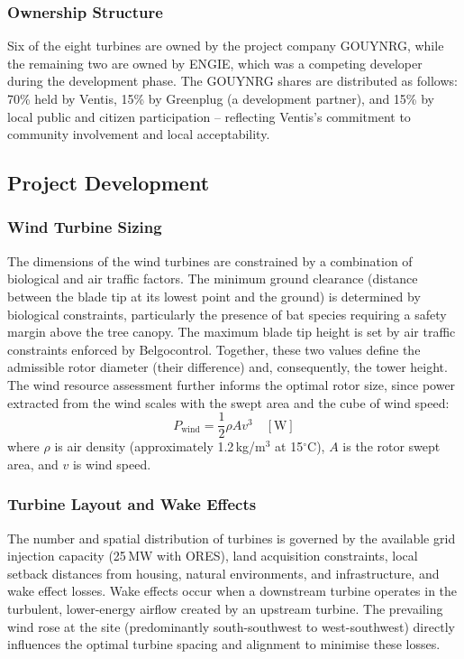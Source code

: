 \subsubsection{Ownership Structure}

Six of the eight turbines are owned by the project company GOUYNRG, while the remaining two
are owned by ENGIE, which was a competing developer during the development phase. The GOUYNRG
shares are distributed as follows: 70\% held by Ventis, 15\% by Greenplug (a development
partner), and 15\% by local public and citizen participation -- reflecting Ventis's commitment
to community involvement and local acceptability.

\subsection{Project Development}

\subsubsection{Wind Turbine Sizing}

The dimensions of the wind turbines are constrained by a combination of biological and
air traffic factors. The minimum ground clearance (distance between the blade tip at its lowest
point and the ground) is determined by biological constraints, particularly the presence of
bat species requiring a safety margin above the tree canopy. The maximum blade tip height is
set by air traffic constraints enforced by Belgocontrol. Together, these two values define
the admissible rotor diameter (their difference) and, consequently, the tower height. The
wind resource assessment further informs the optimal rotor size, since power extracted from
the wind scales with the swept area and the cube of wind speed:
\[
  P_{\text{wind}} = \frac{1}{2} \rho A v^3 \quad [\text{W}]
\]
where $\rho$ is air density (approximately 1.2\,kg/m$^3$ at 15$^\circ$C), $A$ is the rotor
swept area, and $v$ is wind speed.

\subsubsection{Turbine Layout and Wake Effects}

The number and spatial distribution of turbines is governed by the available grid injection
capacity (25\,MW with ORES), land acquisition constraints, local setback distances from
housing, natural environments, and infrastructure, and wake effect losses. Wake effects occur
when a downstream turbine operates in the turbulent, lower-energy airflow created by an
upstream turbine. The prevailing wind rose at the site (predominantly south-southwest to
west-southwest) directly influences the optimal turbine spacing and alignment to minimise
these losses.

